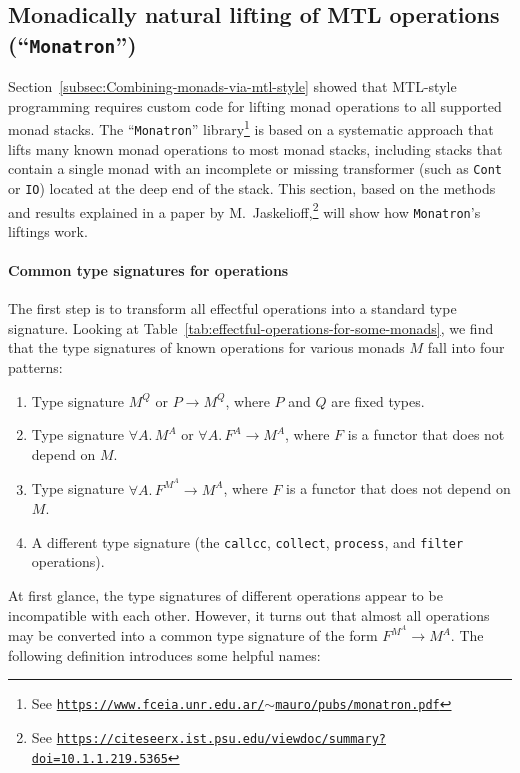 \subsection{Monadically natural lifting of MTL operations (\textquotedblleft\texttt{Monatron}\textquotedblright )\label{subsec:Monatron}}

Section~\ref{subsec:Combining-monads-via-mtl-style} showed that
MTL-style programming requires custom code for lifting monad operations
to all supported monad stacks. The \textsf{``}\texttt{Monatron}\textsf{''} library\footnote{See \texttt{\href{https://www.fceia.unr.edu.ar/~mauro/pubs/monatron.pdf}{https://www.fceia.unr.edu.ar/$\sim$mauro/pubs/monatron.pdf}}}
is based on a systematic approach that lifts many known monad operations
to most monad stacks, including stacks that contain a single monad
with an incomplete or missing transformer (such as \lstinline!Cont!
or \lstinline!IO!) located at the deep end of the stack. This section,
based on the methods and results explained in a paper by M.~Jaskelioff,\footnote{See \texttt{\href{https://citeseerx.ist.psu.edu/viewdoc/summary?doi=10.1.1.219.5365}{https://citeseerx.ist.psu.edu/viewdoc/summary?doi=10.1.1.219.5365}}}
will show how \texttt{Monatron}\textsf{'}s liftings work. 

\paragraph{Common type signatures for operations}

The first step is to transform all effectful operations into a standard
type signature. Looking at Table~\ref{tab:effectful-operations-for-some-monads},
we find that the type signatures of known operations for various monads
$M$ fall into four patterns: 
\begin{enumerate}
\item Type signature $M^{Q}$ or $P\rightarrow M^{Q}$, where $P$ and $Q$
are fixed types.
\item Type signature $\forall A.\,M^{A}$ or $\forall A.\,F^{A}\rightarrow M^{A}$,
where $F$ is a functor that does not depend on $M$.
\item Type signature $\forall A.\,F^{M^{A}}\rightarrow M^{A}$, where $F$
is a functor that does not depend on $M$.
\item A different type signature (the \lstinline!callcc!, \lstinline!collect!,
\lstinline!process!, and \lstinline!filter! operations).
\end{enumerate}
At first glance, the type signatures of different operations appear
to be incompatible with each other. However, it turns out that almost
all operations may be converted into a common type signature of the
form $F^{M^{A}}\rightarrow M^{A}$. The following definition introduces
some helpful names:

